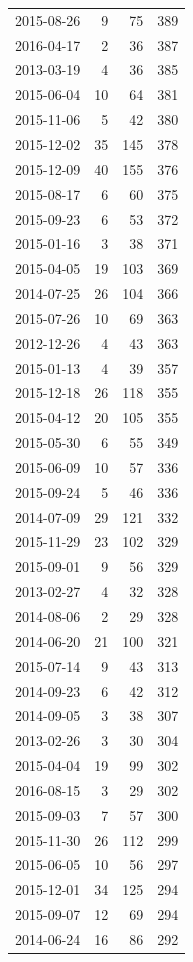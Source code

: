 \begin{tabular}{lrrr}
2015-08-26 & 9 & 75 & 389 \\
2016-04-17 & 2 & 36 & 387 \\
2013-03-19 & 4 & 36 & 385 \\
2015-06-04 & 10 & 64 & 381 \\
2015-11-06 & 5 & 42 & 380 \\
2015-12-02 & 35 & 145 & 378 \\
2015-12-09 & 40 & 155 & 376 \\
2015-08-17 & 6 & 60 & 375 \\
2015-09-23 & 6 & 53 & 372 \\
2015-01-16 & 3 & 38 & 371 \\
2015-04-05 & 19 & 103 & 369 \\
2014-07-25 & 26 & 104 & 366 \\
2015-07-26 & 10 & 69 & 363 \\
2012-12-26 & 4 & 43 & 363 \\
2015-01-13 & 4 & 39 & 357 \\
2015-12-18 & 26 & 118 & 355 \\
2015-04-12 & 20 & 105 & 355 \\
2015-05-30 & 6 & 55 & 349 \\
2015-06-09 & 10 & 57 & 336 \\
2015-09-24 & 5 & 46 & 336 \\
2014-07-09 & 29 & 121 & 332 \\
2015-11-29 & 23 & 102 & 329 \\
2015-09-01 & 9 & 56 & 329 \\
2013-02-27 & 4 & 32 & 328 \\
2014-08-06 & 2 & 29 & 328 \\
2014-06-20 & 21 & 100 & 321 \\
2015-07-14 & 9 & 43 & 313 \\
2014-09-23 & 6 & 42 & 312 \\
2014-09-05 & 3 & 38 & 307 \\
2013-02-26 & 3 & 30 & 304 \\
2015-04-04 & 19 & 99 & 302 \\
2016-08-15 & 3 & 29 & 302 \\
2015-09-03 & 7 & 57 & 300 \\
2015-11-30 & 26 & 112 & 299 \\
2015-06-05 & 10 & 56 & 297 \\
2015-12-01 & 34 & 125 & 294 \\
2015-09-07 & 12 & 69 & 294 \\
2014-06-24 & 16 & 86 & 292 \\

\end{tabular}
